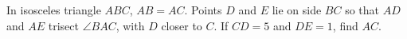In isosceles triangle $ABC$, $AB=AC$. Points $D$ and $E$ lie on side $BC$ so that $AD$ and $AE$ trisect $\angle BAC$, with $D$ closer to $C$. If $CD=5$ and $DE=1$, find $AC$.
